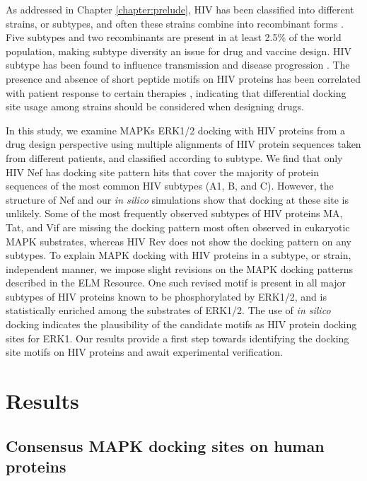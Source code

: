 As addressed in Chapter \ref{chapter:prelude}, HIV has been classified
into different strains, or subtypes, and often these strains combine
into recombinant forms \cite{taylor08}. Five subtypes and two
recombinants are present in at least 2.5\% of the world population,
making subtype diversity an issue for drug and vaccine design. HIV
subtype has been found to influence transmission and disease
progression \cite{taylor08}. The presence and absence of short peptide
motifs on HIV proteins has been correlated with patient response to
certain therapies \cite{dampier09}, indicating that differential
docking site usage among strains should be considered when designing
drugs.

In this study, we examine MAPKs ERK1/2 docking with HIV proteins from a
drug design perspective using multiple alignments of HIV protein
sequences taken from different patients, and classified according to
subtype. We find that only HIV Nef has docking site pattern hits that
cover the majority of protein sequences of the most common HIV
subtypes (A1, B, and C). However, the structure of Nef and our \textit{in
silico} simulations show that docking at these site is unlikely. Some
of the most frequently observed subtypes of HIV proteins MA, Tat, and
Vif are missing the docking pattern most often observed in eukaryotic
MAPK substrates, whereas HIV Rev does not show the docking pattern on
any subtypes. To explain MAPK docking with HIV proteins in a subtype,
or strain, independent manner, we impose slight revisions on the MAPK
docking patterns described in the ELM Resource. One such revised motif
is present in all major subtypes of HIV proteins known to be
phosphorylated by ERK1/2, and is statistically enriched among the
substrates of ERK1/2. The use of \textit{in silico} docking indicates the
plausibility of the candidate motifs as HIV protein docking sites for
ERK1. Our results provide a first step towards identifying the docking
site motifs on HIV proteins and await experimental verification.


\section{Results}

\subsection{Consensus MAPK docking sites on human proteins}

